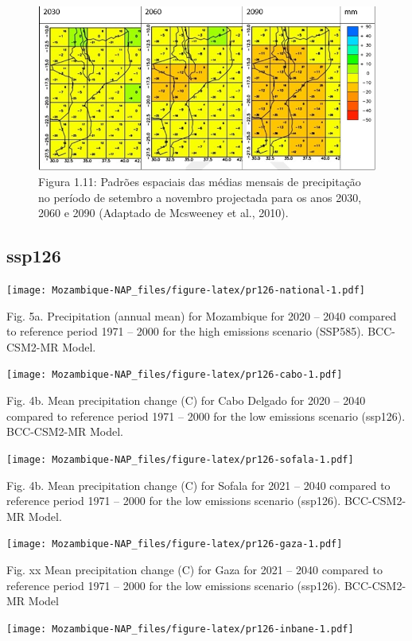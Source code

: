 \documentclass[
]{book}
\begin{document}
\begin{figure}
\centering
\includegraphics{images/padroes especiais.png}
\caption{Figura 1.11: Padrões espaciais das médias mensais de precipitação no período de setembro a novembro projectada para os anos 2030, 2060 e 2090 (Adaptado de Mcsweeney et al., 2010).}
\end{figure}

\hypertarget{ssp126}{%
\subsection{ssp126}\label{ssp126}}

\texttt{[image: Mozambique-NAP\_files/figure-latex/pr126-national-1.pdf]}

Fig. 5a. Precipitation (annual mean) for Mozambique for 2020 -- 2040 compared to reference period 1971 -- 2000 for the high emissions scenario (SSP585). BCC-CSM2-MR Model.

\texttt{[image: Mozambique-NAP\_files/figure-latex/pr126-cabo-1.pdf]}

Fig. 4b. Mean precipitation change (C) for Cabo Delgado for 2020 -- 2040 compared to reference period 1971 -- 2000 for the low emissions scenario (ssp126). BCC-CSM2-MR Model.

\texttt{[image: Mozambique-NAP\_files/figure-latex/pr126-sofala-1.pdf]}

Fig. 4b. Mean precipitation change (C) for Sofala for 2021 -- 2040 compared to reference period 1971 -- 2000 for the low emissions scenario (ssp126). BCC-CSM2-MR Model.

\texttt{[image: Mozambique-NAP\_files/figure-latex/pr126-gaza-1.pdf]}

Fig. xx Mean precipitation change (C) for Gaza for 2021 -- 2040 compared to reference period 1971 -- 2000 for the low emissions scenario (ssp126). BCC-CSM2-MR Model

\texttt{[image: Mozambique-NAP\_files/figure-latex/pr126-inbane-1.pdf]}
\end{document}

